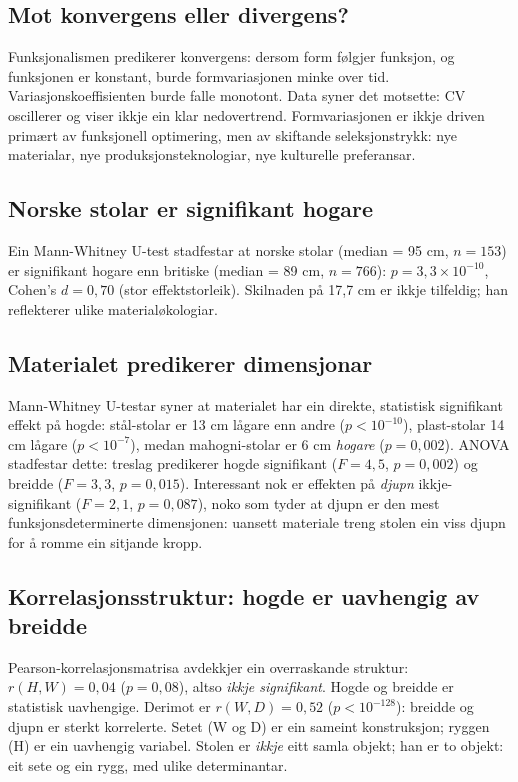 \documentclass[10pt, a4paper, twocolumn]{article}
\begin{document}
\subsection{Mot konvergens eller divergens?}

Funksjonalismen predikerer konvergens: dersom form følgjer funksjon, og funksjonen er konstant, burde formvariasjonen minke over tid. Variasjonskoeffisienten burde falle monotont. Data syner det motsette: CV oscillerer og viser ikkje ein klar nedovertrend. Formvariasjonen er ikkje driven primært av funksjonell optimering, men av skiftande seleksjonstrykk: nye materialar, nye produksjonsteknologiar, nye kulturelle preferansar.

\subsection{Norske stolar er signifikant hogare}

Ein Mann-Whitney U-test stadfestar at norske stolar (median = 95 cm, $n = 153$) er signifikant hogare enn britiske (median = 89 cm, $n = 766$): $p = 3{,}3 \times 10^{-10}$, Cohen's $d = 0{,}70$ (stor effektstorleik). Skilnaden på 17,7 cm er ikkje tilfeldig; han reflekterer ulike materialøkologiar.

\subsection{Materialet predikerer dimensjonar}

Mann-Whitney U-testar syner at materialet har ein direkte, statistisk signifikant effekt på hogde: stål-stolar er 13 cm lågare enn andre ($p < 10^{-10}$), plast-stolar 14 cm lågare ($p < 10^{-7}$), medan mahogni-stolar er 6 cm \emph{hogare} ($p = 0{,}002$). ANOVA stadfestar dette: treslag predikerer hogde signifikant ($F = 4{,}5$, $p = 0{,}002$) og breidde ($F = 3{,}3$, $p = 0{,}015$). Interessant nok er effekten på \emph{djupn} ikkje-signifikant ($F = 2{,}1$, $p = 0{,}087$), noko som tyder at djupn er den mest funksjonsdeterminerte dimensjonen: uansett materiale treng stolen ein viss djupn for å romme ein sitjande kropp.

\subsection{Korrelasjonsstruktur: hogde er uavhengig av breidde}

Pearson-korrelasjonsmatrisa avdekkjer ein overraskande struktur: $r(H,W) = 0{,}04$ ($p = 0{,}08$), altso \emph{ikkje signifikant}. Hogde og breidde er statistisk uavhengige. Derimot er $r(W,D) = 0{,}52$ ($p < 10^{-128}$): breidde og djupn er sterkt korrelerte. Setet (W og D) er ein sameint konstruksjon; ryggen (H) er ein uavhengig variabel. Stolen er \emph{ikkje} eitt samla objekt; han er to objekt: eit sete og ein rygg, med ulike determinantar.
\end{document}
